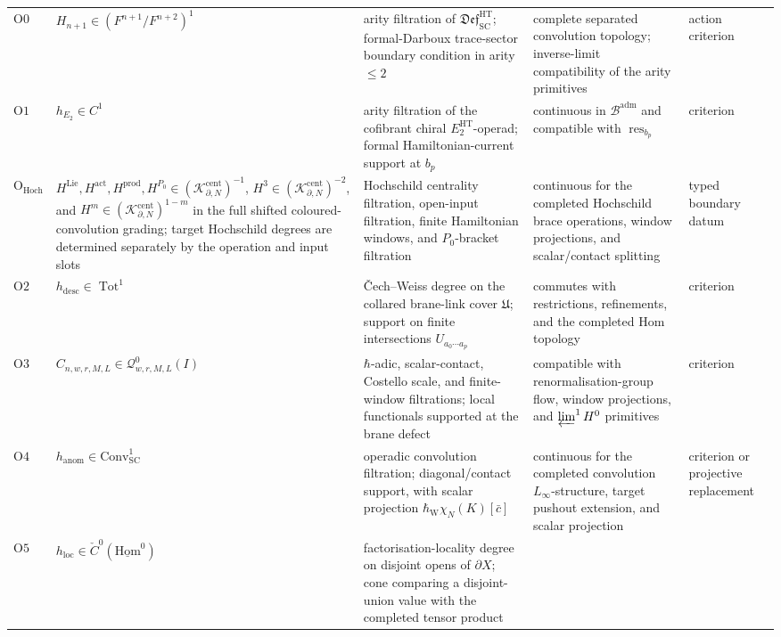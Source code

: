 \begin{thm}
\begin{center}
\begin{tabular}{@{}p{}|p{}|p{}|p{}|p{}@{}}
\(\mathrm{O0}\) &
\(H_{n+1}\in(F^{n+1}/F^{n+2})^1\) &
arity filtration of
\(\mathfrak{Def}^{\mathrm{HT}}_{\mathrm{SC}}\); formal-Darboux
trace-sector boundary condition in arity \(\le2\) &
complete separated convolution topology; inverse-limit compatibility of
the arity primitives &
action criterion\\
\(\mathrm{O1}\) &
\(h_{E_2}\in C^1\) &
arity filtration of the cofibrant chiral \(E_2^{\mathrm{HT}}\)-operad;
formal Hamiltonian-current support at \(b_p\) &
continuous in \(\mathcal B^{\mathrm{adm}}\) and compatible with
\(\operatorname{res}_{b_p}\) &
criterion\\
\(\mathrm{O}_{\mathrm{Hoch}}\) &
\(H^{\mathrm{Lie}},H^{\mathrm{act}},H^{\mathrm{prod}},H^{P_0}\in
(\mathcal K^{\mathrm{cent}}_{\partial,N})^{-1}\),
\(H^3\in(\mathcal K^{\mathrm{cent}}_{\partial,N})^{-2}\), and
  \(H^m\in(\mathcal K^{\mathrm{cent}}_{\partial,N})^{1-m}\) in the
  full shifted coloured-convolution grading; target Hochschild degrees
  are determined separately by the operation and input slots &
Hochschild centrality filtration, open-input filtration, finite
Hamiltonian windows, and \(P_0\)-bracket filtration &
continuous for the completed Hochschild brace operations, window
projections, and scalar/contact splitting &
typed boundary datum\\
\(\mathrm{O2}\) &
\(h_{\mathrm{desc}}\in\operatorname{Tot}^1\) &
Čech--Weiss degree on the collared brane-link cover \(\mathfrak U\);
support on finite intersections \(U_{a_0\cdots a_p}\) &
commutes with restrictions, refinements, and the completed Hom topology &
criterion\\
\(\mathrm{O3}\) &
\(C_{n,w,r,M,L}\in\mathcal Q^0_{w,r,M,L}(I)\) &
\(\hbar\)-adic, scalar-contact, Costello scale, and finite-window
filtrations; local functionals supported at the brane defect &
compatible with renormalisation-group flow, window projections, and
\(\varprojlim^1H^0\) primitives &
criterion\\
\(\mathrm{O4}\) &
\(h_{\mathrm{anom}}\in\mathrm{Conv}_{\mathrm{SC}}^1\) &
operadic convolution filtration; diagonal/contact support, with scalar
projection \(\hbar_{\mathrm{W}}\chi_N(K)[\bar c]\) &
continuous for the completed convolution \(L_\infty\)-structure,
target pushout extension, and scalar projection &
criterion or projective replacement\\
\(\mathrm{O5}\) &
\(h_{\mathrm{loc}}\in\check C^0(\underline{\mathrm{Hom}}^0)\) &
factorisation-locality degree on disjoint opens of \(\partial X\);
cone comparing a disjoint-union value with the completed tensor product

\end{tabular}
\end{center}
\end{thm}
